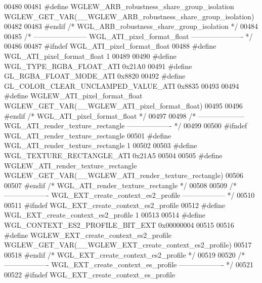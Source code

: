 \begin{DoxyCode}
00480 
00481 \textcolor{preprocessor}{#define WGLEW\_ARB\_robustness\_share\_group\_isolation
       WGLEW\_GET\_VAR(\_\_WGLEW\_ARB\_robustness\_share\_group\_isolation)}
00482 
00483 \textcolor{preprocessor}{#endif }\textcolor{comment}{/* WGL\_ARB\_robustness\_share\_group\_isolation */}\textcolor{preprocessor}{}
00484 
00485 \textcolor{comment}{/* ----------------------- WGL\_ATI\_pixel\_format\_float ---------------------- */}
00486 
00487 \textcolor{preprocessor}{#ifndef WGL\_ATI\_pixel\_format\_float}
00488 \textcolor{preprocessor}{#define WGL\_ATI\_pixel\_format\_float 1}
00489 
00490 \textcolor{preprocessor}{#define WGL\_TYPE\_RGBA\_FLOAT\_ATI 0x21A0}
00491 \textcolor{preprocessor}{#define GL\_RGBA\_FLOAT\_MODE\_ATI 0x8820}
00492 \textcolor{preprocessor}{#define GL\_COLOR\_CLEAR\_UNCLAMPED\_VALUE\_ATI 0x8835}
00493 
00494 \textcolor{preprocessor}{#define WGLEW\_ATI\_pixel\_format\_float WGLEW\_GET\_VAR(\_\_WGLEW\_ATI\_pixel\_format\_float)}
00495 
00496 \textcolor{preprocessor}{#endif }\textcolor{comment}{/* WGL\_ATI\_pixel\_format\_float */}\textcolor{preprocessor}{}
00497 
00498 \textcolor{comment}{/* -------------------- WGL\_ATI\_render\_texture\_rectangle ------------------- */}
00499 
00500 \textcolor{preprocessor}{#ifndef WGL\_ATI\_render\_texture\_rectangle}
00501 \textcolor{preprocessor}{#define WGL\_ATI\_render\_texture\_rectangle 1}
00502 
00503 \textcolor{preprocessor}{#define WGL\_TEXTURE\_RECTANGLE\_ATI 0x21A5}
00504 
00505 \textcolor{preprocessor}{#define WGLEW\_ATI\_render\_texture\_rectangle WGLEW\_GET\_VAR(\_\_WGLEW\_ATI\_render\_texture\_rectangle)}
00506 
00507 \textcolor{preprocessor}{#endif }\textcolor{comment}{/* WGL\_ATI\_render\_texture\_rectangle */}\textcolor{preprocessor}{}
00508 
00509 \textcolor{comment}{/* ------------------- WGL\_EXT\_create\_context\_es2\_profile ------------------ */}
00510 
00511 \textcolor{preprocessor}{#ifndef WGL\_EXT\_create\_context\_es2\_profile}
00512 \textcolor{preprocessor}{#define WGL\_EXT\_create\_context\_es2\_profile 1}
00513 
00514 \textcolor{preprocessor}{#define WGL\_CONTEXT\_ES2\_PROFILE\_BIT\_EXT 0x00000004}
00515 
00516 \textcolor{preprocessor}{#define WGLEW\_EXT\_create\_context\_es2\_profile WGLEW\_GET\_VAR(\_\_WGLEW\_EXT\_create\_context\_es2\_profile)}
00517 
00518 \textcolor{preprocessor}{#endif }\textcolor{comment}{/* WGL\_EXT\_create\_context\_es2\_profile */}\textcolor{preprocessor}{}
00519 
00520 \textcolor{comment}{/* ------------------- WGL\_EXT\_create\_context\_es\_profile ------------------- */}
00521 
00522 \textcolor{preprocessor}{#ifndef WGL\_EXT\_create\_context\_es\_profile}

\end{DoxyCode}
